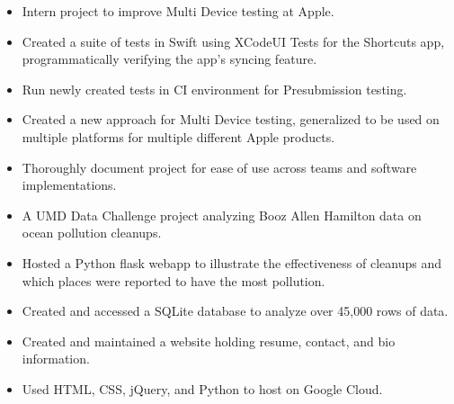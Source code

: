\documentclass[11pt]{article}
\begin{document}
\vspace{2mm}
{\fontsize{10}{12}\robotocondlight
\begin{itemize}[noitemsep,nolistsep]
    \item Intern project to improve Multi Device testing at Apple. 
    \item Created a suite of tests in {\robotocond Swift} using {\robotocond XCodeUI Tests} for the Shortcuts app, programmatically verifying the app's syncing feature.
    \item Run newly created tests in CI environment for Presubmission testing.
    \item Created a new approach for Multi Device testing, generalized to be used on multiple platforms for multiple different Apple products. 
    \item Thoroughly document project for ease of use across teams and software implementations.
\end{itemize}
\begin{itemize}[noitemsep,nolistsep]
    \item A UMD Data Challenge project analyzing Booz Allen Hamilton data on ocean pollution cleanups. 
    \item Hosted a {\robotocond Python flask} webapp to illustrate the effectiveness of cleanups and which places were reported to have the most pollution. 
    \item Created and accessed a {\robotocond SQLite} database to analyze over 45,000 rows of data.
\end{itemize}
\begin{itemize}[noitemsep,nolistsep]
    \item Created and maintained a website holding resume, contact, and bio information.
    \item Used {\robotocond HTML}, {\robotocond CSS}, {\robotocond jQuery}, and {\robotocond Python} to host on {\robotocond Google Cloud}.
\end{itemize}
}
\end{document}
